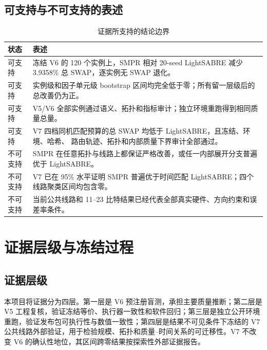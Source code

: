 \documentclass[11pt,a4paper]{article}
\begin{document}
\subsection{可支持与不可支持的表述}

\begin{table}[H]
\centering
\caption{证据所支持的结论边界}
\begin{tabularx}{\textwidth}{C{1.7cm}Y}
\toprule
状态 & 表述 \\
\midrule
\textcolor{GainGreen}{可支持}
& 冻结 V6 的 120 个实例上，SMPR 相对 20-seed LightSABRE 减少
3.9358\% 总 SWAP，逐实例无 SWAP 退化。\\
\textcolor{GainGreen}{可支持}
& 实例级和因子单元级 bootstrap 区间均完全低于零；所有留一层级后的总改善仍为正。\\
\textcolor{GainGreen}{可支持}
& V5/V6 全部实例通过语义、拓扑和指标审计；独立环境重跑得到相同质量总量。\\
\textcolor{GainGreen}{可支持}
& V7 四档同机匹配预算的总 SWAP 均低于 LightSABRE，且冻结、环境、哈希、
路由轨迹、拓扑和内部质量下界审计全部通过。\\
\textcolor{WarnRed}{不可支持}
& SMPR 在任意拓扑与线路上都保证严格改善，或任一内部展开分支普遍优于 LightSABRE。\\
\textcolor{WarnRed}{不可支持}
& V7 已在 95\% 水平证明 SMPR 普遍优于时间匹配 LightSABRE；四个线路聚类区间均包含零。\\
\textcolor{WarnRed}{不可支持}
& 当前公共线路和 11--23 比特结果已经代表全部真实硬件、方向约束和误差率条件。\\
\bottomrule
\end{tabularx}
\end{table}

\section{证据层级与冻结过程}

\subsection{证据层级}

本项目将证据分为四层。第一层是 V6 预注册盲测，承担主要质量推断；第二层是
V5 工程复核，验证冻结等价、执行器一致性和软件回归；第三层是独立公开环境
重跑，验证发布包可执行性与数值一致性；第四层是结果不可见条件下冻结的 V7
公共线路外部验证，用于检验规模、拓扑和质量--时间关系的可迁移性。V7 不改变
V6 的确认性地位，其区间跨零结果按探索性外部证据报告。
\end{document}
